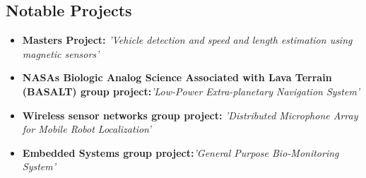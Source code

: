\documentclass[11pt,a4paper,sans]{moderncv}        %
\begin{document}
\vspace{2pt}

\subsection{Notable Projects}


\begin{itemize}

\item{\textbf{Masters Project:} \textit{'Vehicle detection and speed and length estimation using magnetic sensors'}}

\vspace{2pt}


\vspace{2pt}

\item{\textbf{NASAs Biologic Analog Science Associated with Lava Terrain (BASALT) group project:}\textit{'Low-Power Extra-planetary Navigation System'}}



\vspace{2pt}

\item{\textbf{Wireless sensor networks group project:} \textit{'Distributed Microphone Array for Mobile Robot Localization'}}

\vspace{2pt}



\item{\textbf{Embedded Systems group project:}\textit{'General Purpose Bio-Monitoring System'}}



\end{itemize}
\end{document}
